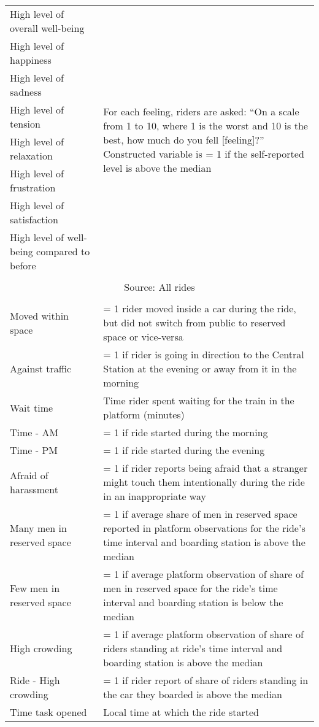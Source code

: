 \begin{table}[H]
\begin{tabular}{p{.4\linewidth}p{.6\linewidth}}
High level of overall well-being	 & \multirow{8}{*}{\parbox{\linewidth}{For each feeling, riders are asked: ``On a scale from 1 to 10, where 1 is the worst and 10 is the best, how much do you fell [feeling]?'' \\
Constructed variable is = 1 if the self-reported level is above the median}}  	\\
High level of happiness	 &	\\
High level of sadness	&  \\
High level of tension	 &	\\
High level of relaxation	 & 	\\
High level of frustration	 & \\
High level of satisfaction	 & 	\\
High level of well-being compared to before	 & 	\\\\[-1.8ex]
\hline
\multicolumn{2}{c}{Source: All rides} \\
\hline\\[-1.8ex]
Moved within space	&	= 1 rider moved inside a car during the ride, but did not switch from public to reserved space or vice-versa \\
Against traffic		&	= 1 if rider is going in direction to the Central Station at the evening or away from it in the morning	\\
Wait time & Time rider spent waiting for the train in the platform (minutes) \\
Time - AM		&	= 1 if ride started during the morning	\\
Time - PM		&	= 1 if ride started during the evening	\\
Afraid of harassment		&	= 1 if rider reports being afraid that a stranger might touch them intentionally during the ride in an inappropriate way	\\
Many men in reserved space		&	= 1 if average share of men in reserved space reported in platform observations for the ride's time interval and boarding station is above the median	\\
Few men in reserved space		&	= 1 if average platform observation of share of men in reserved space for the ride's time interval and boarding station is below the median	\\
High crowding		&	= 1 if average platform observation of share of riders standing at ride's time interval and boarding station is above the median	\\
Ride - High crowding		&	= 1 if rider report of share of riders standing in the car they boarded is above the median	\\
Time task opened		&	Local time at which the ride started	\\
    \hline\hline
    \end{tabular}
\end{table}

